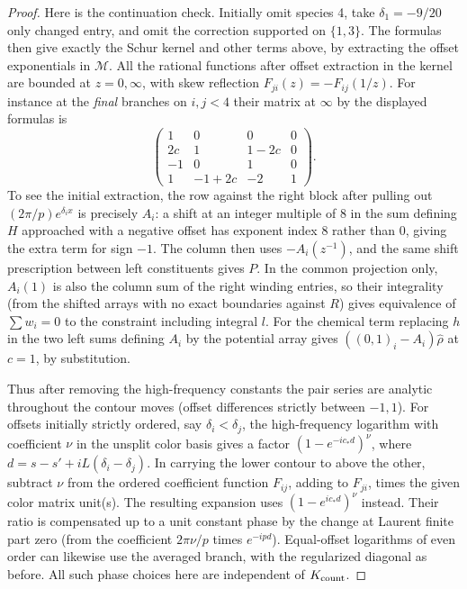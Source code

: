 \begin{proof}
Here is the continuation check. Initially omit species 4, take \(\delta_1=-9/20\) only changed entry, and omit the correction supported on \(\{1,3\}\). The formulas then give exactly the Schur kernel and other terms above, by extracting the offset exponentials in \(\mathcal M\). All the rational functions after offset extraction in the kernel are bounded at \(z=0,\infty\), with skew reflection \(F_{ji}(z)=-F_{ij}(1/z)\). For instance at the \emph{final} branches on \(i,j<4\) their matrix at \(\infty\) by the displayed formulas is
\[
 \begin{pmatrix}
 1&0&0&0\\2c&1&1-2c&0\\-1&0&1&0\\1&-1+2c&-2&1
 \end{pmatrix}.
\]
To see the initial extraction, the row against the right block after pulling out \((2\pi/p)e^{\delta_i x}\) is precisely \(A_i\): a shift at an integer multiple of 8 in the sum defining \(H\) approached with a negative offset has exponent index 8 rather than 0, giving the extra term for sign \(-1\). The column then uses \(-A_i(z^{-1})\), and the same shift prescription between left constituents gives \(P\). In the common projection only, \(A_i(1)\) is also the column sum of the right winding entries, so their integrality (from the shifted arrays with no exact boundaries against \(R\)) gives equivalence of \(\sum w_i=0\) to the constraint including integral \(l\). For the chemical term replacing \(h\) in the two left sums defining \(A_i\) by the potential array gives \(((0,1)_i-A_i)\widehat\rho\) at \(c=1\), by substitution.

Thus after removing the high-frequency constants the pair series are analytic throughout the contour moves (offset differences strictly between \(-1,1\)). For offsets initially strictly ordered, say \(\delta_i<\delta_j\), the high-frequency logarithm with coefficient \(\nu\) in the unsplit color basis gives a factor
\((1-e^{-ic_*d})^\nu\), where \(d=s-s'+iL(\delta_i-\delta_j)\). In carrying the lower contour to above the other, subtract \(\nu\) from the ordered coefficient function \(F_{ij}\), adding to \(F_{ji}\), times the given color matrix unit(s). The resulting expansion uses \((1-e^{ic_*d})^\nu\) instead. Their ratio is compensated up to a unit constant phase by the change at Laurent finite part zero (from the coefficient \(2\pi\nu/p\) times \(e^{-ipd}\)). Equal-offset logarithms of even order can likewise use the averaged branch, with the regularized diagonal as before. All such phase choices here are independent of \(K_{\rm count}\).


\end{proof}
